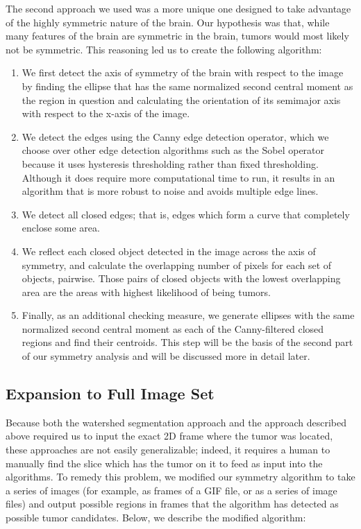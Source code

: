 \documentclass[12pt]{article}
\theoremstyle{plain}%
\theoremstyle{definition}
\theoremstyle{remark}
\begin{document}
The second approach we used was a more unique one designed to take advantage of the highly symmetric nature of the brain. Our hypothesis was that, while many features of the brain are symmetric in the brain, tumors would most likely not be symmetric. This reasoning led us to create the following algorithm:

\begin{enumerate}
\item We first detect the axis of symmetry of the brain with respect to the image by finding the ellipse that has the same normalized second central moment as the region in question and calculating the orientation of its semimajor axis with respect to the x-axis of the image.
\item We detect the edges using the Canny edge detection operator, which we choose over other edge detection algorithms such as the Sobel operator because it uses hysteresis thresholding rather than fixed thresholding. Although it does require more computational time to run, it results in an algorithm that is more robust to noise and avoids multiple edge lines.
\item We detect all closed edges; that is, edges which form a curve that completely enclose some area.
\item We reflect each closed object detected in the image across the axis of symmetry, and calculate the overlapping number of pixels for each set of objects, pairwise. Those pairs of closed objects with the lowest overlapping area are the areas with highest likelihood of being tumors.
\item Finally, as an additional checking measure, we generate ellipses with the same normalized second central moment as each of the Canny-filtered closed regions and find their centroids. This step will be the basis of the second part of our symmetry analysis and will be discussed more in detail later.
\end{enumerate}

\subsection{Expansion to Full Image Set}

Because both the watershed segmentation approach and the approach described above required us to input the exact 2D frame where the tumor was located, these approaches are not easily generalizable; indeed, it requires a human to manually find the slice which has the tumor on it to feed as input into the algorithms. To remedy this problem, we modified our symmetry algorithm to take a series of images (for example, as frames of a GIF file, or as a series of image files) and output possible regions in frames that the algorithm has detected as possible tumor candidates. Below, we describe the modified algorithm:
\end{document}
